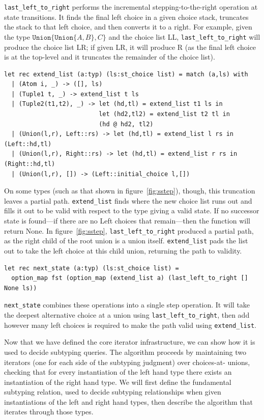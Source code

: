 \documentclass[a4paper,english]{lipics-v2018}
\newcommand{\xt}[1]{\texttt{#1}}
\newcommand{\union}[2]{\xt{Union\{}#1,#2\xt{\}}}
\begin{document}
\verb|last_left_to_right| performs the incremental stepping-to-the-right operation at
state transitions. It finds the final left choice in a given choice stack, truncates the
stack to that left choice, and then converts it to a right. For example, given the type 
$\union{\union{A}{B}}{C}$ and the choice list LL, \verb|last_left_to_right| will 
produce the choice list LR; if given LR, it will produce R (as the final left choice
is at the top-level and it truncates the remainder of the choice list).

\begin{verbatim}
let rec extend_list (a:typ) (ls:st_choice list) = match (a,ls) with
  | (Atom i, _) -> ([], ls)
  | (Tuple1 t, _) -> extend_list t ls
  | (Tuple2(t1,t2), _) -> let (hd,tl) = extend_list t1 ls in
                          let (hd2,tl2) = extend_list t2 tl in
                          (hd @ hd2, tl2)
  | (Union(l,r), Left::rs) -> let (hd,tl) = extend_list l rs in (Left::hd,tl)
  | (Union(l,r), Right::rs) -> let (hd,tl) = extend_list r rs in (Right::hd,tl)
  | (Union(l,r), []) -> (Left::initial_choice l,[])
\end{verbatim}

On some types (such as that shown in figure~\ref{fig:sstep}), though, this
truncation leaves a partial path. \verb|extend_list| finds where the new
choice list runs out and fills it out to be valid with respect to the type
giving a valid state. If no successor state is found---if there are no Left
choices that remain---then the function will return None. In figure~\ref{fig:sstep},
\verb|last_left_to_right| produced a partial path, as the right child of the root
union is a union itself. \verb|extend_list| pads the list out to take the left choice
at this child union, returning the path to validity.

\begin{verbatim}
let rec next_state (a:typ) (ls:st_choice list) =
  option_map fst (option_map (extend_list a) (last_left_to_right [] None ls))
\end{verbatim}

\verb|next_state| combines these operations into a single step operation. It
will take the deepest alternative choice at a union using
\verb|last_left_to_right|, then add however many left choices is required to
make the path valid using \verb|extend_list|. 

Now that we have defined the core iterator infrastructure, we can show how it
is used to decide subtyping queries. The algorithm proceeds by maintaining two
iterators (one for each side of the subtyping judgment) over choices-at-
unions,  checking that for every instantiation of the left hand type there
exists an instantiation of the right hand type. We will first define the
fundamental subtyping relation, used to decide subtyping relationships when
given instantiations of the left and right hand types, then describe the
algorithm that iterates through those types.
\end{document}
